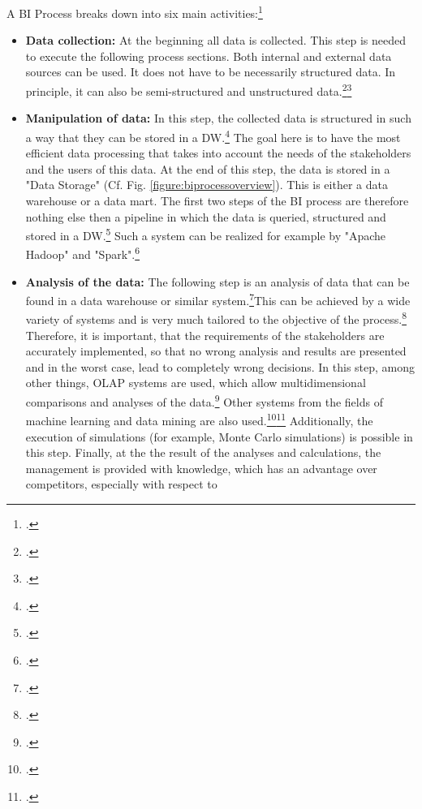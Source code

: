 A \ac{BI} Process breaks down into six main activities:\footcite[Cf.][Fig. 2]{foley2010business}
\begin{itemize}
    \item \textbf{Data collection: }At the beginning all data is collected. This step is needed to execute the following
    process sections. Both internal and external data sources can be used. It does not have to be
    necessarily structured data. In principle, it can also be semi-structured and unstructured data.\footcite[Cf.][p. 465]{ranjan2008business}\footcite[Cf.][p. 3]{hartmann2016capturing}
    \item \textbf{Manipulation of data: }In this step, the collected data is structured in such a way that
    they can be stored in a \ac{DW}.\footcite[Cf.][p. 463]{ranjan2008business} The goal here is to have the most
    efficient data processing that takes into account the needs of the stakeholders and the users of this data.
    At the end of this step, the data is stored in a "Data Storage" (Cf. Fig. \ref{figure:biprocessoverview}).
    This is either a data warehouse or a data mart. The first two steps of the \ac{BI} process are therefore nothing else then a
    pipeline in which the data is queried, structured and stored in a \ac{DW}.\footcite[Cf.][p. 466]{ranjan2008business}
    Such a system can be realized for example by "Apache Hadoop" and
    "Spark".\footcite[Cf.][p. 65]{rahman2015big}
    \item \textbf{Analysis of the data: }The following step is an analysis of data that can be found in a data warehouse or similar
    system.\footcite[Cf.][p. 16]{kasemsap2016fundamentals}This can be achieved by a wide variety of systems
    and is very much tailored to the objective of the process.\footcite[Cf.][p. 21]{niu2009cognition} Therefore, it is important,
    that the requirements of the stakeholders are accurately implemented, so that no wrong analysis and results are presented and in the worst case,
    lead to completely wrong decisions. In this step, among other things, \ac{OLAP}
    systems are used, which allow multidimensional comparisons and analyses of the data.\footcite[Cf.][pp. 107]{hovcevar2010assessing}
    Other systems from the fields of machine learning and data mining are also used.\footcite[Cf.][p. 11]{foley2010business}\footcite[Cf.][p. 80]{yeoh2008managing}
    Additionally, the
    execution of simulations (for example, Monte Carlo simulations) is possible in this step. Finally, at the
    the result of the analyses and calculations, the management is provided with knowledge, which has an advantage over competitors, especially with respect to

\end{itemize}
